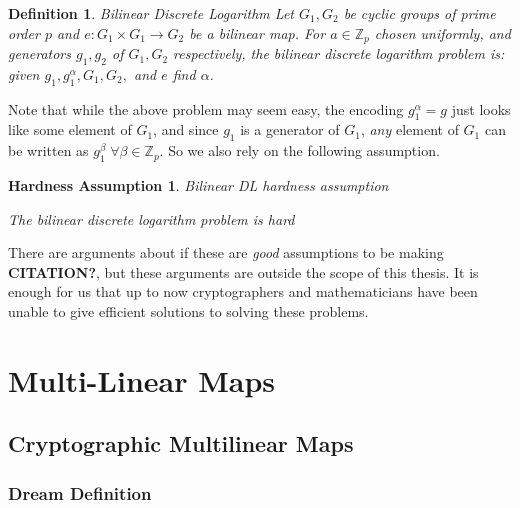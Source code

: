 \documentclass[12pt,twoside]{reedthesis}
\newtheorem{definition}{Definition}
\newtheorem{assumption}{Hardness Assumption}
\newcommand{\Z}[0]{\mathbb{Z}}
\begin{document}
    \begin{definition}{Bilinear Discrete Logarithm}
    Let $G_1,G_2$ be cyclic groups of prime order $p$ and $e:G_1 \times G_1 \to G_2$ be a bilinear map. For $a \in \Z_p$ chosen uniformly, and generators $g_1,g_2$ of $G_1,G_2$ respectively, the bilinear discrete logarithm problem is: given $g_1,g_1^\alpha, G_1, G_2,$ and $e$ find $\alpha$.
    \end{definition}
    
    Note that while the above problem may seem easy, the encoding $g_1^\alpha = g $ just looks like some element of $G_1$, and since $g_1$ is a generator of $G_1$, \textit{any} element of $G_1$ can be written as $g_1^\beta \; \forall \beta \in \Z_p$. So we also rely on the following assumption.
    
    \begin{assumption}{Bilinear DL hardness assumption}
    \par The bilinear discrete logarithm problem is hard
    \end{assumption}
   
    
    There are arguments about if these are \textit{good} assumptions to be making \textbf{CITATION?}, but these arguments are outside the scope of this thesis. It is enough for us that up to now cryptographers and mathematicians have been unable to give efficient solutions to solving these problems.
    
    
    \chapter{Multi-Linear Maps}
    
    \section{Cryptographic Multilinear Maps}
    
    
    \subsection{Dream Definition}
    
\end{document}
